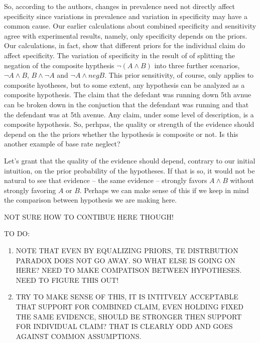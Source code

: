 \documentclass[10pt,dvipsnames,enabledeprecatedfontcommands]{scrartcl}
\begin{document}
So, according to the authors, changes in prevalence need not directly
affect specificity since variations in prevalence and variation in
specificity may have a common cause. Our earlier calculations about
combined specificity and sensitivity agree with experimental results,
namely, only specificity depends on the priors. Our calculations, in
fact, show that different priors for the individual claim do affect
specificity. The variation of specificity in the result of of splitting
the negation of the composite hypthesis \(\neg (A \wedge B)\) into three
further scenarios, \(\neg A \wedge B\), \(B \wedge \neg A\) and
\(\neg A \wedge neg B\). This prior sensitivity, of course, only applies
to composite hyotheses, but to some extent, any hypothesis can be
analyzed as a composite hypothesis. The claim that the defedant was
running down 5th avnue can be broken down in the conjuction that the
defendant was running and that the defendant was at 5th avenue. Any
claim, under some level of description, is a composite hypothesis. So,
perhpas, the quality or strength of the evidence should depend on the
the priors whether the hypothesis is composite or not. Is this another
example of base rate neglect?

Let's grant that the quality of the evidence should depend, contrary to
our initial intuition, on the prior probability of the hypotheses. If
that is so, it would not be natural to see that evidence -- the same
evidence -- strongly favors \(A\wedge B\) without strongly favoring
\(A\) or \(B\). Perhaps we can make sense of this if we keep in mind the
comparison between hypothesis we are making here.

NOT SURE HOW TO CONTIBUE HERE THOUGH!

TO DO:

\begin{enumerate}
\def\labelenumi{\arabic{enumi}.}
\item
  NOTE THAT EVEN BY EQUALIZING PRIORS, TE DISTRBUTION PARADOX DOES NOT
  GO AWAY. SO WHAT ELSE IS GOING ON HERE? NEED TO MAKE COMPATISON
  BETWEEN HYPOTHESES. NEED TO FIGURE THIS OUT!
\item
  TRY TO MAKE SENSE OF THIS, IT IS INTITVELY ACCEPTABLE THAT SUPPORT FOR
  COMBINED CLAIM, EVEN HOLDING FIXED THE SAME EVIDENCE, SHOULD BE
  STRONGER THEN SUPPORT FOR INDIVIDUAL CLAIM? THAT IS CLEARLY ODD AND
  GOES AGAINST COMMON ASSUMPTIONS.
\end{enumerate}
\end{document}
